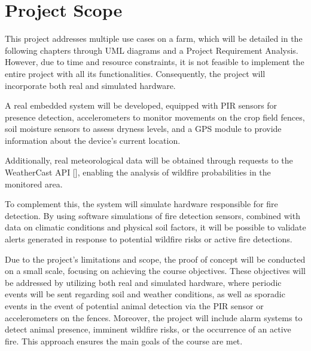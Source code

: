 \section{Project Scope}
This project addresses multiple use cases on a farm, which will be detailed in the following chapters through UML diagrams and a 
Project Requirement Analysis. However, due to time and resource constraints, it is not feasible to implement the entire project 
with all its functionalities. Consequently, the project will incorporate both real and simulated hardware.

A real embedded system will be developed, equipped with PIR sensors for presence detection, accelerometers to monitor movements on
the crop field fences, soil moisture sensors to assess dryness levels, and a GPS module to provide information about the device’s current location.

Additionally, real meteorological data will be obtained through requests to the WeatherCast API [], enabling the analysis of wildfire probabilities in the monitored area.

To complement this, the system will simulate hardware responsible for fire detection. By using software simulations of fire detection
sensors, combined with data on climatic conditions and physical soil factors, it will be possible to validate alerts generated in response
to potential wildfire risks or active fire detections.

Due to the project’s limitations and scope, the proof of concept will be conducted on a small scale, focusing on achieving the course objectives.
These objectives will be addressed by utilizing both real and simulated hardware, where periodic events will be sent regarding soil and weather conditions,
as well as sporadic events in the event of potential animal detection via the PIR sensor or accelerometers on the fences.  Moreover, the project will
include alarm systems to detect animal presence, imminent wildfire risks, or the occurrence of an active fire. This approach ensures the main goals of the course are met.
